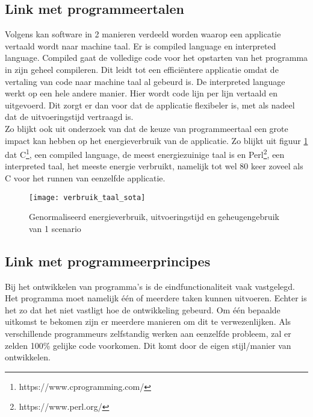 \subsection{Link met programmeertalen}
Volgens \textcite{Jain2024} kan software in 2 manieren verdeeld worden waarop een applicatie vertaald wordt naar machine taal. Er is compiled language en interpreted language. Compiled gaat de volledige code voor het opstarten van het programma in zijn geheel compileren. Dit leidt tot een efficiëntere applicatie omdat de vertaling van code naar machine taal al gebeurd is. De interpreted language werkt op een hele andere manier. Hier wordt code lijn per lijn vertaald en uitgevoerd. Dit zorgt er dan voor dat de applicatie flexibeler is, met als nadeel dat de uitvoeringstijd vertraagd is.\\

Zo blijkt ook uit onderzoek van \textcite{Pereira2017} dat de keuze van programmeertaal een grote impact kan hebben op het energieverbruik van de applicatie. Zo blijkt uit figuur \ref{verbruik_taal_sota} dat C\footnote{https://www.cprogramming.com/}, een compiled language, de meest energiezuinige taal is en Perl\footnote{https://www.perl.org/}, een interpreted taal, het meeste energie verbruikt, namelijk tot wel 80 keer zoveel als C voor het runnen van eenzelfde applicatie. \\

\begin{figure}[H]
    \texttt{[image: verbruik\_taal\_sota]}
    \centering
    \caption{Genormaliseerd energieverbruik, uitvoeringstijd en geheugengebruik van 1 scenario \autocite{Pereira2017}}
    
    \label{verbruik_taal_sota}
\end{figure}


\subsection{Link met programmeerprincipes}
Bij het ontwikkelen van programma's is de eindfunctionaliteit vaak vastgelegd. Het programma moet namelijk één of meerdere taken kunnen uitvoeren. Echter is het zo dat het niet vastligt hoe de ontwikkeling gebeurd. Om één bepaalde uitkomst te bekomen zijn er meerdere manieren om dit te verwezenlijken. Als verschillende programmeurs zelfstandig werken aan eenzelfde probleem, zal er zelden 100\% gelijke code voorkomen. Dit komt door de eigen stijl/manier van ontwikkelen.\\

